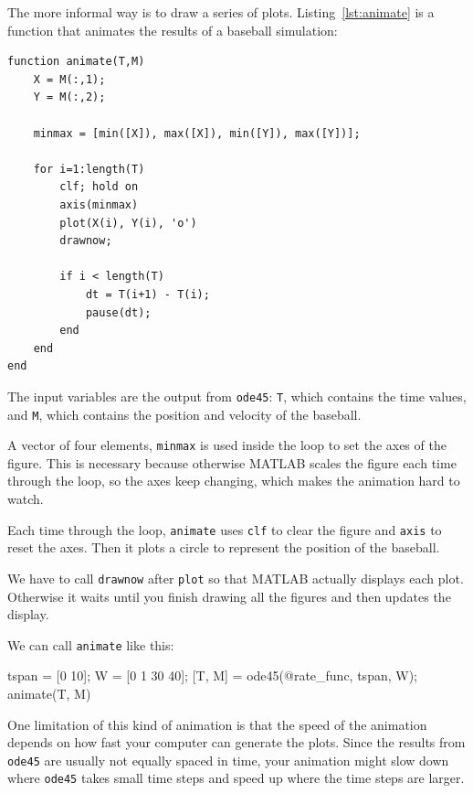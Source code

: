 
The more informal way is to draw a series of plots.  Listing~\ref{lst:animate} is a function that animates the results of a baseball simulation:

\begin{lstlisting}[caption={A function that animates the results of a baseball simulation}, label={lst:animate}]
function animate(T,M)
    X = M(:,1);
    Y = M(:,2);

    minmax = [min([X]), max([X]), min([Y]), max([Y])];

    for i=1:length(T)
        clf; hold on
        axis(minmax)
        plot(X(i), Y(i), 'o')
        drawnow;
        
        if i < length(T)
            dt = T(i+1) - T(i);
            pause(dt);
        end
    end
end
\end{lstlisting}

The input variables are the output from \lstinline{ode45}: \lstinline{T}, which contains the time values, and \lstinline{M}, which contains the position and velocity of the baseball.


A vector of four elements, \lstinline{minmax} is used inside the loop to set the axes of the figure.  
This is necessary because otherwise MATLAB scales the figure each time through the loop,
so the axes keep changing, which makes the animation hard to watch.


Each time through the loop, \lstinline{animate} uses \lstinline{clf}
to clear the figure and \lstinline{axis} to reset the axes.  Then it plots a circle to represent the position of the \mbox{baseball}.


We have to call \lstinline{drawnow} after \lstinline{plot} so
that MATLAB actually displays each plot.  Otherwise it waits
until you finish drawing all the figures and then updates
the display.

We can call \lstinline{animate} like this:

\begin{code}
    tspan = [0 10];
    W = [0 1 30 40];
    [T, M] = ode45(@rate_func, tspan, W);
    animate(T, M)
\end{code}

One limitation of this kind of animation is that the speed
of the animation depends on how fast your computer can generate
the plots.  Since the results from \lstinline{ode45} are usually not
equally spaced in time, your animation might slow down where
\lstinline{ode45} takes small time steps and speed up where the time
steps are larger.

